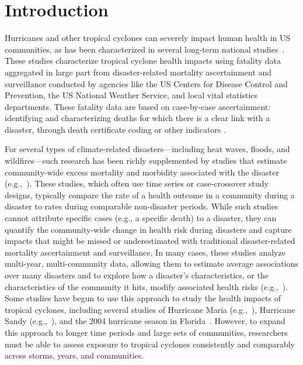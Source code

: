 \section*{Introduction}

\acresetall

Hurricanes and other tropical cyclones can severely impact human health in
\ac{US} communities, as has been characterized in several long-term national
studies~\parencite{rappaport2000, rappaport2014fatalities,
rappaport2016fatalities, czajkowski2010fatal, czajkowski2011, moore2012}.
These studies characterize tropical cyclone health impacts using fatality data
aggregated in large part from disaster-related mortality ascertainment and
surveillance conducted by agencies like the \ac{US} Centers for Disease Control
and Prevention, the \ac{US} National Weather Service, and local vital
statistics departments. These fatality data are based on case-by-case
ascertainment: identifying and characterizing deaths for which there is a clear
link with a disaster, through death certificate coding or other indicators
\parencite{rocha2017medicolegal}.  

For several types of climate-related disasters---including heat waves, floods,
and wildfires---such research has been richly supplemented by studies that
estimate community-wide excess mortality and morbidity associated with the
disaster (e.g.,~\cite{anderson2010heat, son2012impact, haikerwal2015impact,
liu2017wildfire, milojevic2017mental}).  These studies, which often use time
series or case-crossover study designs, typically compare the rate of a health
outcome in a community during a disaster to rates during comparable
non-disaster periods.  While such studies cannot attribute specific cases
(e.g., a specific death) to a disaster, they can quantify the community-wide
change in health risk during disasters and capture impacts that might be missed
or underestimated with traditional disaster-related mortality ascertainment and
surveillance.  In many cases, these studies analyze multi-year, multi-community
data, allowing them to estimate average associations over many disasters and to
explore how a disaster's characteristics, or the characteristics of the
community it hits, modify associated health risks
(e.g.,~\cite{anderson2010heat, son2012impact, liu2017wildfire}).  Some studies
have begun to use this approach to study the health impacts of tropical
cyclones, including several studies of Hurricane Maria
(e.g.,~\cite{santos2018use, santos2018differential}), Hurricane Sandy
(e.g.,~\cite{kim2016, mongin2017, swerdel2014}), and the 2004 hurricane season
in Florida~\parencite{mckinney2011}.  However, to expand this approach to
longer time periods and large sets of communities, researchers must be able to
assess exposure to tropical cyclones consistently and comparably across storms,
years, and communities.  

